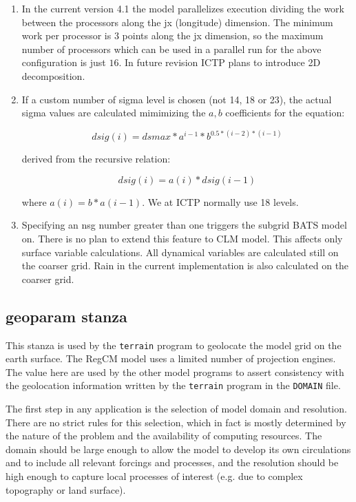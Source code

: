 \begin{enumerate}
\item In the current version 4.1 the model parallelizes execution dividing
the work between the processors along the jx (longitude) dimension. The
minimum work per processor is 3 points along the jx dimension, so the maximum
number of processors which can be used in a parallel run for the above
configuration is just $16$. In future revision ICTP plans to introduce 2D
decomposition.
\item If a custom number of sigma level is chosen (not 14, 18 or 23), the actual
sigma values are calculated mimimizing the $a,b$ coefficients for the 
equation:

\begin{equation}
  dsig(i) = dsmax*a^{i-1}*b^{0.5*(i-2)*(i-1)}
\end{equation}

derived from the recursive relation:

\begin{equation}
  dsig(i) = a(i)*dsig(i-1)
\end{equation}

where $a(i) = b*a(i-1)$. We at ICTP normally use 18 levels.
\item Specifying an nsg number greater than one triggers the subgrid BATS model
on. There is no plan to extend this feature to CLM model. This affects only
surface variable calculations. All dynamical variables are calculated still
on the coarser grid. Rain in the current implementation is also calculated on
the coarser grid.
\end{enumerate}

\subsection{geoparam stanza}
\label{geoparam}

This stanza is used by the \verb=terrain= program to geolocate the model grid
on the earth surface. The RegCM model uses a limited number of projection
engines. The value here are used by the other model programs to assert
consistency with the geolocation information written by the \verb=terrain=
program in the \verb=DOMAIN= file.

The first step in any application is the selection of model domain and
resolution. There are no strict rules for this selection, which in fact is
mostly determined by the nature of the problem and the availability of
computing resources. The domain should be large enough to allow the model to
develop its own circulations and to include all relevant forcings and
processes, and the resolution should be high enough to capture local processes
of interest (e.g. due to complex topography or land surface).

